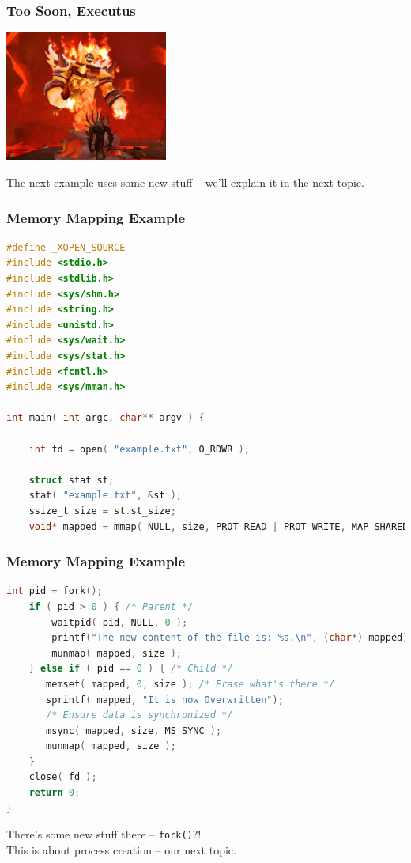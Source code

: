 \begin{frame}
\frametitle{Too Soon, Executus}

\begin{center}
  \includegraphics[width=0.4\textwidth]{images/ragnaros.jpg}
\end{center}

The next example uses some new stuff -- we'll explain it in the next topic.

\end{frame}


\begin{frame}[fragile]
	\frametitle{Memory Mapping Example}

	\begin{lstlisting}[language=C]
#define _XOPEN_SOURCE
#include <stdio.h>
#include <stdlib.h>
#include <sys/shm.h>
#include <string.h>
#include <unistd.h>
#include <sys/wait.h>
#include <sys/stat.h>
#include <fcntl.h>
#include <sys/mman.h>

int main( int argc, char** argv ) { 

    int fd = open( "example.txt", O_RDWR );
    
    struct stat st; 
    stat( "example.txt", &st );
    ssize_t size = st.st_size;
    void* mapped = mmap( NULL, size, PROT_READ | PROT_WRITE, MAP_SHARED, fd, 0 );  
\end{lstlisting}
\end{frame}

\begin{frame}[fragile]
	\frametitle{Memory Mapping Example}

	\begin{lstlisting}[language=C]
    int pid = fork();
    if ( pid > 0 ) { /* Parent */
        waitpid( pid, NULL, 0 );
        printf("The new content of the file is: %s.\n", (char*) mapped);
        munmap( mapped, size );
    } else if ( pid == 0 ) { /* Child */
       memset( mapped, 0, size ); /* Erase what's there */
       sprintf( mapped, "It is now Overwritten");
       /* Ensure data is synchronized */
       msync( mapped, size, MS_SYNC );
       munmap( mapped, size );
    }
    close( fd );
    return 0;
}
\end{lstlisting}

There's some new stuff there -- \texttt{fork()}?!\\
\quad This is about process creation -- our next topic.

\end{frame}

